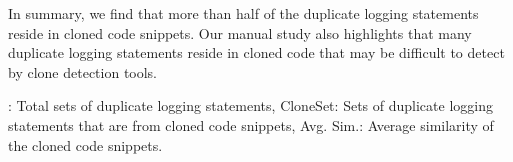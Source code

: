 In summary, we find that more than half of the duplicate logging statements reside in cloned code snippets. Our manual study also highlights that many duplicate logging statements reside in cloned code that may be difficult to detect by clone detection tools.



\begin{table}
    \caption{Automated code clone analysis results on duplicate logging statements.}


    \vspace{-0.3cm}
    \centering
    \resizebox{\columnwidth}{!} {
    \tabcolsep=18pt
    }
    : Total sets of duplicate logging statements, {\sf CloneSet}: Sets of duplicate logging statements that are from cloned code snippets,  {\sf Avg. Sim.}: Average similarity of the cloned code snippets.
    \vspace{-0.3cm}
\label{table:RQ4}
\end{table}


